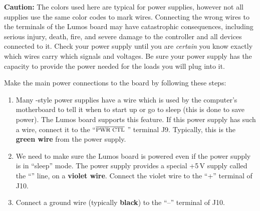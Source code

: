 \documentclass[letterpaper,twoside,onecolumn,openright,final]{memoir}
\begin{document}
{\bfseries Caution:}
The colors used here are typical for  power supplies, however
not all supplies use the same color codes to mark wires.  Connecting the wrong wires to the terminals
of the Lumos board may have catastrophic consequences, including serious injury, death, fire, and severe damage
to the controller and all devices connected to it.  Check your power supply until you are \emph{certain} you know
exactly which wires carry which signals and voltages.  Be sure your power supply has the capacity to provide the
power needed for the loads you will plug into it.

Make the main power connections to the board by following these steps:

\begin{enumerate}
	\item	Many -style power supplies have a wire which is used by the computer's motherboard
		to tell it when to start up or go to sleep (this is done to save power).  The Lumos
		board supports this feature.  If this power supply has such a wire, 
		connect it to the ``$\overline{\hbox{\mc{PWR CTL}}}$ '' terminal
		J9.  Typically, this is the {\bfseries green wire} from the power supply.  

\newpage
	\item	We need to make sure the Lumos board is powered even if the power supply is in %
		``sleep'' %
		mode.  The power supply provides a special +5\,V supply called the 
		``'' line,
		on a {\bfseries violet wire}.  Connect the violet wire to the ``+'' terminal of J10.

	\item	Connect a ground wire (typically {\bfseries black}) to the ``--'' terminal of J10.


\end{enumerate}
\end{document}
